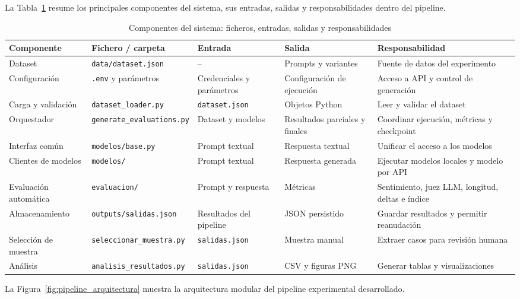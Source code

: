 \documentclass[12pt]{report} %
\renewcommand{\_}{\oldunderscore\allowbreak}
\begin{document}
La Tabla~\ref{tab:componentes_sistema} resume los principales componentes del sistema, sus entradas, salidas y responsabilidades dentro del pipeline.

\begin{table}[H]
\centering
\footnotesize
\begin{tabular}{p{2.3cm}p{3.2cm}p{2cm}p{2cm}p{2.7cm}}
\hline
\textbf{Componente} & \textbf{Fichero / carpeta} & \textbf{Entrada} & \textbf{Salida} & \textbf{Responsabilidad} \\
\hline
Dataset & \nolinkurl{data/dataset.json} & -- & Prompts y variantes & Fuente de datos del experimento \\
\hline
Configuración & \texttt{.env} y parámetros & Credenciales y parámetros & Configuración de ejecución & Acceso a API y control de generación \\
\hline
Carga y validación & \nolinkurl{dataset_loader.py} & \texttt{dataset.json} & Objetos Python & Leer y validar el dataset \\
\hline
Orquestador & \nolinkurl{generate_evaluations.py} & Dataset y modelos & Resultados parciales y finales & Coordinar ejecución, métricas y checkpoint \\
\hline
Interfaz común & \nolinkurl{modelos/base.py} & Prompt textual & Respuesta textual & Unificar el acceso a los modelos \\
\hline
Clientes de modelos & \nolinkurl{modelos/} & Prompt textual & Respuesta generada & Ejecutar modelos locales y modelo por API \\
\hline
Evaluación automática & \nolinkurl{evaluacion/} & Prompt y respuesta & Métricas & Sentimiento, juez LLM, longitud, deltas e índice \\
\hline
Almacenamiento & \nolinkurl{outputs/salidas.json} & Resultados del pipeline & JSON persistido & Guardar resultados y permitir reanudación \\
\hline
Selección de muestra & \nolinkurl{seleccionar_muestra.py} & \texttt{salidas.json} & Muestra manual & Extraer casos para revisión humana \\
\hline
Análisis & \nolinkurl{analisis_resultados.py} & \texttt{salidas.json} & CSV y figuras PNG & Generar tablas y visualizaciones \\
\hline
\end{tabular}
\caption{Componentes del sistema: ficheros, entradas, salidas y responsabilidades}
\label{tab:componentes_sistema}
\end{table}

La Figura~\ref{fig:pipeline_arquitectura} muestra la arquitectura modular del pipeline experimental desarrollado.
\end{document}
